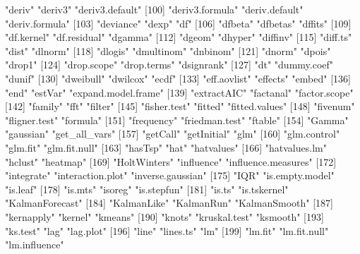 \begin{Schunk}
\begin{Soutput}
 [97] "deriv"                "deriv3"               "deriv3.default"      
[100] "deriv3.formula"       "deriv.default"        "deriv.formula"       
[103] "deviance"             "dexp"                 "df"                  
[106] "dfbeta"               "dfbetas"              "dffits"              
[109] "df.kernel"            "df.residual"          "dgamma"              
[112] "dgeom"                "dhyper"               "diffinv"             
[115] "diff.ts"              "dist"                 "dlnorm"              
[118] "dlogis"               "dmultinom"            "dnbinom"             
[121] "dnorm"                "dpois"                "drop1"               
[124] "drop.scope"           "drop.terms"           "dsignrank"           
[127] "dt"                   "dummy.coef"           "dunif"               
[130] "dweibull"             "dwilcox"              "ecdf"                
[133] "eff.aovlist"          "effects"              "embed"               
[136] "end"                  "estVar"               "expand.model.frame"  
[139] "extractAIC"           "factanal"             "factor.scope"        
[142] "family"               "fft"                  "filter"              
[145] "fisher.test"          "fitted"               "fitted.values"       
[148] "fivenum"              "fligner.test"         "formula"             
[151] "frequency"            "friedman.test"        "ftable"              
[154] "Gamma"                "gaussian"             "get_all_vars"        
[157] "getCall"              "getInitial"           "glm"                 
[160] "glm.control"          "glm.fit"              "glm.fit.null"        
[163] "hasTsp"               "hat"                  "hatvalues"           
[166] "hatvalues.lm"         "hclust"               "heatmap"             
[169] "HoltWinters"          "influence"            "influence.measures"  
[172] "integrate"            "interaction.plot"     "inverse.gaussian"    
[175] "IQR"                  "is.empty.model"       "is.leaf"             
[178] "is.mts"               "isoreg"               "is.stepfun"          
[181] "is.ts"                "is.tskernel"          "KalmanForecast"      
[184] "KalmanLike"           "KalmanRun"            "KalmanSmooth"        
[187] "kernapply"            "kernel"               "kmeans"              
[190] "knots"                "kruskal.test"         "ksmooth"             
[193] "ks.test"              "lag"                  "lag.plot"            
[196] "line"                 "lines.ts"             "lm"                  
[199] "lm.fit"               "lm.fit.null"          "lm.influence"        

\end{Soutput}
\end{Schunk}

